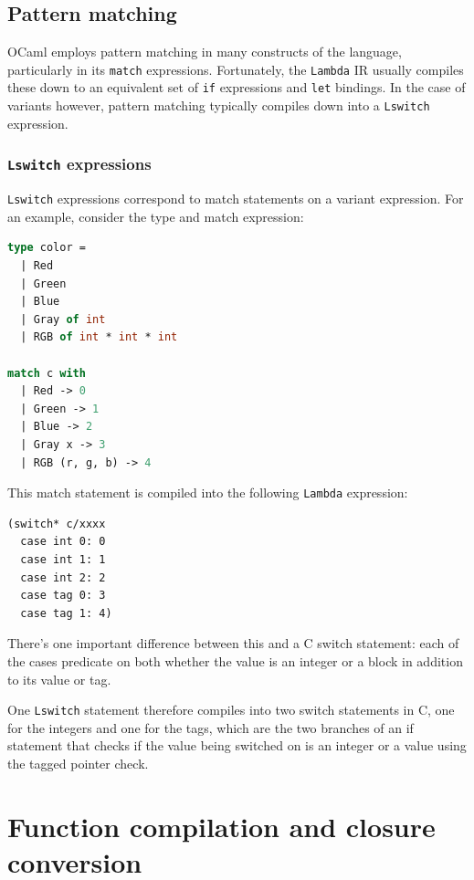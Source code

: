 \documentclass[12pt,a4paper,twoside,openright]{report}
\begin{document}
\subsection{Pattern matching}

OCaml employs pattern matching in many constructs of the language, particularly
in its \texttt{match} expressions. Fortunately, the \texttt{Lambda} IR usually
compiles these down to an equivalent set of \texttt{if} expressions and
\texttt{let} bindings. In the case of variants however, pattern matching
typically compiles down into a \texttt{Lswitch} expression.

\subsubsection{\texttt{Lswitch} expressions}

\texttt{Lswitch} expressions correspond to match statements on a variant 
expression. For an example, consider the type and match expression:

\begin{lstlisting}[language=Caml]
type color =
  | Red
  | Green
  | Blue
  | Gray of int
  | RGB of int * int * int

match c with
  | Red -> 0
  | Green -> 1
  | Blue -> 2
  | Gray x -> 3
  | RGB (r, g, b) -> 4
\end{lstlisting}

This match statement is compiled into the following \texttt{Lambda} expression:

\begin{lstlisting}
(switch* c/xxxx
  case int 0: 0
  case int 1: 1
  case int 2: 2
  case tag 0: 3
  case tag 1: 4)
\end{lstlisting}

There's one important difference between this and a C switch statement: each of
the cases predicate on both whether the value is an integer or a block in
addition to its value or tag.

One \texttt{Lswitch} statement therefore compiles into two switch statements in
C, one for the integers and one for the tags, which are the two branches of an
if statement that checks if the value being switched on is an integer or a value
using the tagged pointer check.

\section{Function compilation and closure conversion} \label{functions}
\end{document}
